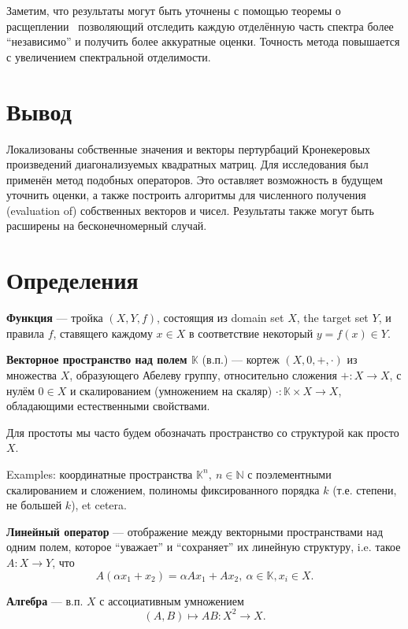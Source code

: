 \documentclass[14pt,a4paper]{extarticle}
\numberwithin{equation}{section}
\theoremstyle{definition}
\begin{document}
Заметим, что результаты могут быть уточнены с помощью теоремы о расщеплении~\cite{baskakov1987theorem}
позволяющий отследить каждую отделённую часть спектра более ``независимо''
и получить более аккуратные оценки.
Точность метода повышается с увеличением спектральной отделимости.

\section{Вывод}

Локализованы собственные значения и векторы пертурбаций Кронекеровых
произведений диагонализуемых квадратных матриц. Для исследования был применён
метод подобных операторов.
Это оставляет возможность в будущем уточнить оценки, а также построить алгоритмы
для численного получения (evaluation of) собственных векторов и чисел.
Результаты также могут быть расширены на бесконечномерный случай.

\newpage
\appendix
\section{Определения}

\textbf{Функция} --- тройка \( (X, Y, f) \), состоящия из domain set \( X \),
the target set \( Y \), и правила \( f \), ставящего каждому \( x\in X\)
в соответствие некоторый \( y=f(x)\in Y \).

\textbf{Векторное пространство над полем \(\mathbb{K}\)} (в.п.) --- кортеж \( (X, 0, +, \cdot) \)
из множества \( X \), образующего Абелеву группу, относительно сложения \(
+:X\to X\), с нулём \( 0\in X \)
и скалированием (умножением на скаляр)
\(\cdot: \mathbb{K}\times X \to X \), обладающими естественными свойствами.

Для простоты мы часто будем обозначать пространство со структурой как просто \( X \).

Examples: координатные пространства \( \mathbb{K}^n,\ n\in\mathbb{N} \) с поэлементными
скалированием и сложением, полиномы фиксированного порядка \( k \) (т.е.
степени, не большей \( k \)), et cetera.

\textbf{Линейный оператор} --- отображение между векторными пространствами над
одним полем,
которое ``уважает'' и ``сохраняет'' их линейную структуру, i.e. такое
\( A:X\to Y \), что
\[ A(\alpha x_1 + x_2) = \alpha Ax_1 + Ax_2,\
\alpha\in\mathbb{K}, x_i\in X. \]

\textbf{Алгебра} --- в.п. \( X \) с ассоциативным
умножением \[ (A, B)\mapsto AB: X^2\to X. \]
\end{document}
